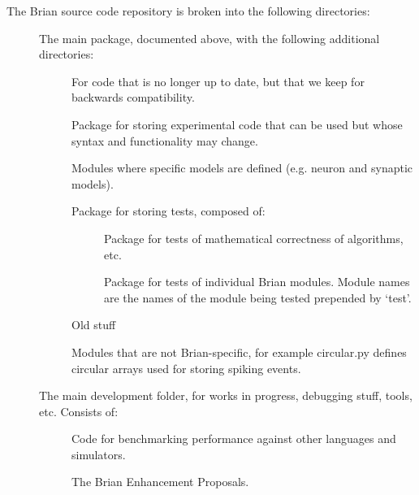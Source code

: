 \documentclass[letterpaper,10pt,english]{manual}
\begin{document}
The Brian source code repository is broken into the following directories:
\begin{description}
\item[] \leavevmode
The main package, documented above, with the following additional directories:
\begin{description}
\item[] \leavevmode
For code that is no longer up to date, but that we keep for backwards
compatibility.

\item[] \leavevmode
Package for storing experimental code that can be used but whose
syntax and functionality may change.

\item[] \leavevmode
Modules where specific models are defined (e.g. neuron and synaptic models).

\item[] \leavevmode
Package for storing tests, composed of:
\begin{description}
\item[] \leavevmode
Package for tests of mathematical correctness of algorithms, etc.

\item[] \leavevmode
Package for tests of individual Brian modules. Module names are
the names of the module being tested prepended by `test'.

\end{description}

\item[] \leavevmode
Old stuff

\item[] \leavevmode
Modules that are not Brian-specific, for example circular.py defines
circular arrays used for storing spiking events.

\end{description}

\item[] \leavevmode
The main development folder, for works in progress, debugging stuff, tools,
etc. Consists of:
\begin{description}
\item[] \leavevmode
Code for benchmarking performance against other languages and
simulators.

\item[] \leavevmode
The Brian Enhancement Proposals.


\end{description}
\end{description}
\end{document}
